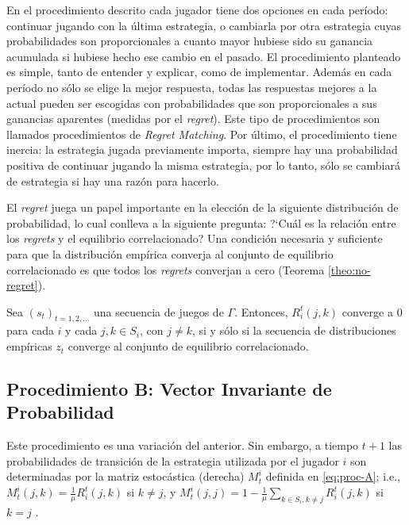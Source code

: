 En el procedimiento descrito cada jugador tiene dos opciones en cada período: continuar jugando con la última estrategia, o cambiarla por otra estrategia cuyas probabilidades son proporcionales a cuanto mayor hubiese sido su ganancia acumulada si hubiese hecho ese cambio en el pasado. El procedimiento planteado es simple, tanto de entender y explicar, como de implementar. Además en cada período no sólo se elige la mejor respuesta, todas las respuestas mejores a la actual pueden ser escogidas con probabilidades que son proporcionales a sus ganancias aparentes (medidas por el \textit{regret}). Este tipo de procedimientos son llamados procedimientos de \textit{Regret Matching}. Por último, el procedimiento tiene inercia: la estrategia jugada previamente importa, siempre hay una probabilidad positiva de continuar jugando la misma estrategia, por lo tanto, sólo se cambiará de estrategia si hay una razón para hacerlo.

El \textit{regret} juega un papel importante en la elección de la siguiente distribución de probabilidad, lo cual conlleva a la siguiente pregunta: ?`Cuál es la relación entre los \textit{regrets} y el equilibrio correlacionado? Una condición necesaria y suficiente para que la distribución empírica converja al conjunto de equilibrio correlacionado es que todos los \textit{regrets} converjan a cero (Teorema \ref{theo:no-regret}).

\begin{theorem}
\label{theo:no-regret}
Sea $(s_t)_{t = 1, 2, ...}$ una secuencia de juegos de $\Gamma$.
Entonces, $R_i^t(j, k)$ converge a $0$ para cada $i$ y cada $j, k \in S_i$, con $j \neq k$, si y sólo si la secuencia de distribuciones empíricas $z_t$ converge al conjunto de equilibrio correlacionado.
\end{theorem}

\subsection*{Procedimiento B: Vector Invariante de Probabilidad}

Este procedimiento es una variación del anterior. Sin embargo, a tiempo $t+1$ las probabilidades de transición de la estrategia utilizada por el jugador $i$ son determinadas por la matriz estocástica (derecha) $M^i_t$ definida en \eqref{eq:proc-A}; i.e., $M^i_t(j,k)=\frac{1}{\mu}R^t_i(j,k)$ si $k\neq j$, y $M^i_t(j,j)=1-\frac{1}{\mu}\sum_{k\in S_i,k\neq j} R^t_i(j,k)$ si $k=j$ \cite[p.~1133]{bib:correlated-equilibrium}.

